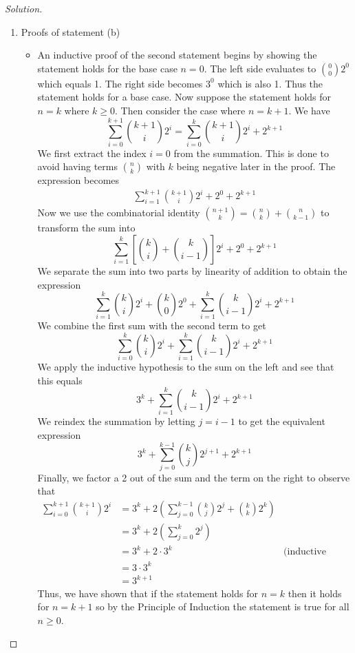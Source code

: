\documentclass[12pt]{article}
\theoremstyle{definition}
\newenvironment{solution}{
  \begin{proof}[Solution]
    \vspace{-8px}
    \setlength{\parskip}{4px}
    \setlength{\parindent}{0px}
}{
\end{proof}
}
\begin{document}
\begin{solution}
\begin{enumerate}[label={(\alph*)}]
\begin{itemize}
      \end{itemize}
      \item Proofs of statement (b)
      \begin{itemize}
        \item An inductive proof of the second statement begins by showing the statement holds for the base case \(n=0\). The left side evaluates to \({0 \choose 0} 2^0\) which equals 1. The right side becomes \(3^0\) which is also 1. Thus the statement holds for a base case. Now suppose the statement holds for \(n = k\) where \(k \geq 0\). Then consider the case where \(n = k+1\). We have
        \[
          \sum_{i=0}^{k+1} {k+1 \choose i} 2^i = \sum_{i=0}^{k} {k+1 \choose i} 2^i + 2^{k+1}
        \]
        We first extract the index \(i=0\) from the summation. This is done to avoid having terms \({n \choose k}\) with \(k\) being negative later in the proof. The expression becomes
        \begin{align*}
          \sum_{i=1}^{k+1} {k+1 \choose i} 2^i + 2^0 + 2^{k+1}
        \end{align*}
        Now we use the combinatorial identity \({n+1 \choose k} = {n \choose k} + {n \choose k-1}\) to transform the sum into
        \[
          \sum_{i=1}^{k} \left[{k \choose i} + {k \choose i-1} \right]2^i + 2^0 + 2^{k+1}
        \]
        We separate the sum into two parts by linearity of addition to obtain the expression
        \[
          \sum_{i=1}^{k} {k \choose i} 2^i + {k \choose 0} 2^0 + \sum_{i=1}^{k} {k \choose i-1} 2^i + 2^{k+1}
        \]
        We combine the first sum with the second term to get
        \[
          \sum_{i=0}^{k} {k \choose i} 2^i + \sum_{i=1}^{k} {k \choose i-1} 2^i + 2^{k+1}
        \]
        We apply the inductive hypothesis to the sum on the left and see that this equals
        \[
          3^k + \sum_{i=1}^{k} {k \choose i-1} 2^i + 2^{k+1}
        \]
        We reindex the summation by letting \(j = i-1\) to get the equivalent expression
        \[
          3^k + \sum_{j=0}^{k-1} {k \choose j} 2^{j+1} + 2^{k+1}
        \]
        Finally, we factor a 2 out of the sum and the term on the right to observe that
        \begin{align*}
          \sum_{i=0}^{k+1} {k+1 \choose i}2^{i} &= 3^k + 2 \left( \sum_{j=0}^{k-1} {k \choose j} 2^j + {k \choose k} 2^k \right) \\
          &= 3^k + 2 \left(\sum_{j=0}^{k} 2^j \right) \\
          &= 3^k + 2 \cdot 3^k &\text{(inductive hypothesis)} \\
          &= 3 \cdot 3^k \\
          &= 3^{k+1}
        \end{align*}
        Thus, we have shown that if the statement holds for \(n=k\) then it holds for \(n=k+1\) so by the Principle of Induction the statement is true for all \(n \geq 0\).


\end{itemize}
\end{enumerate}
\end{solution}
\end{document}
